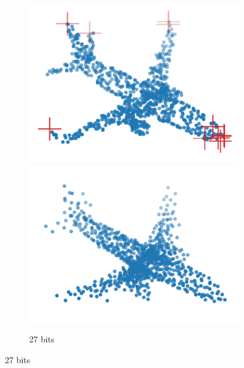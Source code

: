 \begin{figure}[t]
\begin{subfigure}[b]{\subfigureouterhspace}
\begin{subsubfigure}[b]{\subfigurehspace}
      \includegraphics[width=\linewidth]{img/point_cloud_compression/crit/test_airplane_0630/micro_3.pdf}
      \includegraphics[width=\linewidth]{img/point_cloud_compression/rec/test_airplane_0630/micro_3.pdf}
      \caption{27 bits}
      \label{fig:rec/micro/3}
    \end{subsubfigure}%
    \hfill%
    \begin{subsubfigure}[b]{\subfigurehspace}
      \centering

\end{subsubfigure}
\end{subfigure}
\end{figure}
